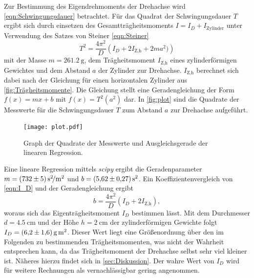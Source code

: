 Zur Bestimmung des Eigendrehmoments der Drehachse wird \autoref{eqn:Schwingungsdauer} betrachtet. Für das Quadrat der Schwingungsdauer $T$ ergibt sich
durch einsetzen des Gesamtträgheitsmoments $I = I_D + I_\text{Zylinder}$ unter Verwendung des Satzes von Steiner \eqref{eqn:Steiner}
\begin{equation}
  \label{eqn:I_D}
  T^2 = \frac{4\pi^2}{D}\left(I_D + 2I_\text{Z,h} + 2 m a^2) \right)
\end{equation}
mit der Masse $m = \qty{261.2}{\gram}$, dem Trägheitsmoment $I_\text{Z,h}$ eines zylinderförmigen Gewichtes und dem Abstand $a$ der Zylinder zur Drehachse. $I_\text{Z,h}$
berechnet sich dabei nach der Gleichung für einen horizontalen Zylinder aus \autoref{fig:Trägheitsmomente}.
Die Gleichung stellt eine Geradengleichung der Form $f(x) = mx +b$ mit $f(x) = T^2(a^2)$ dar. In \autoref{fig:plot} sind die 
Quadrate der Messwerte für die Schwingungsdauer $T$ zum Abstand $a$ zur Drehachse aufgeführt. 
\begin{figure}
  \centering
  \texttt{[image: plot.pdf]}
  \caption{Graph der Quadrate der Messwerte und Ausgleichsgerade der linearen Regression. \cite{matplotlib}}
  \label{fig:plot}
\end{figure}
Eine lineare Regression mittels \textit{scipy} \cite{scipy} ergibt die Geradenparameter $m = \qty{732 +- 5}{\second\squared\per\metre\squared}$ und 
$b = \qty{5.62 +- 0.27}{\second\squared}$. Ein Koeffizientenvergleich von \autoref{eqn:I_D} und der Geradengleichung ergibt 
\begin{equation*}
  b = \frac{4\pi^2}{D}(I_D + 2I_\text{Z,h}),
\end{equation*}
woraus sich das Eigenträgheitsmoment $I_D$ bestimmen lässt. Mit dem Durchmesser $d = \qty{4.5}{\centi\metre}$ und der Höhe $h = \qty{2}{\centi\metre}$ der zylinderförmigen
Gewichte folgt $I_D = \qty{6.2 +- 1.6}{\gram\square\metre}$. Dieser Wert liegt eine Größenordnung über den im Folgenden zu bestimmenden Trägheitsmomenten, was nicht der 
Wahrheit entsprechen kann, da das Trägheitsmoment der Drehachse selbst sehr viel kleiner ist. Näheres hierzu findet sich in \autoref{sec:Diskussion}. Der wahre Wert von
$I_D$ wird für weitere Rechnungen als vernachlässigbar gering angenommen.

